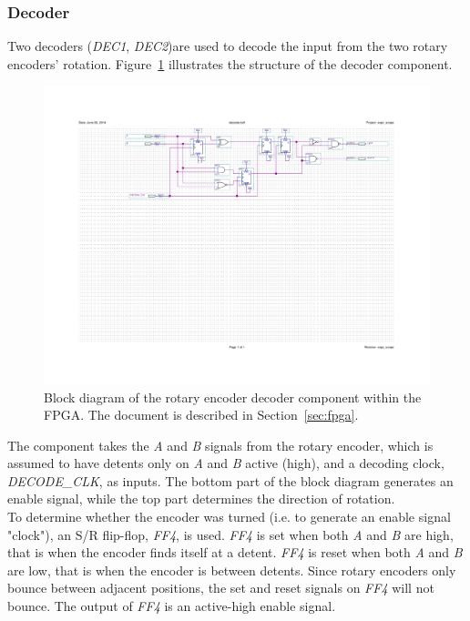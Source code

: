 \documentclass[titlepage]{scrartcl}
\begin{document}
	\clearpage
	
	\subsubsection{Decoder \label{sec:decoder}}
	Two decoders (\textit{DEC1}, \textit{DEC2})are used to decode the input from the two rotary encoders' rotation. Figure~\ref{fig:decoder_bdf} illustrates the structure of the decoder component.\\

	\begin{figure}[h!]
	\vspace{-4cm}
	\centerline{\includegraphics[width=30cm, angle=90, origin=c]{img/decoder.pdf}}	
		\vspace{-2cm}
                	\caption{Block diagram of the rotary encoder decoder component within the FPGA. The document is described in Section~\ref{sec:fpga}.}
               	\label{fig:decoder_bdf}
	\end{figure}

	The component takes the \textit{A} and \textit{B} signals from the rotary encoder, which is assumed to have detents only on \textit{A} and \textit{B} active (high), and a decoding clock, \textit{DECODE\_CLK}, as inputs. The bottom part of the block diagram generates an enable signal, while the top part determines the direction of rotation.\\

	To determine whether the encoder was turned (i.e. to generate an enable signal "clock"), an S/R flip-flop, \textit{FF4}, is used. \textit{FF4} is set when both \textit{A} and \textit{B} are high, that is when the encoder finds itself at a detent. \textit{FF4} is reset when both \textit{A} and \textit{B} are low, that is when the encoder is between detents. Since rotary encoders only bounce between adjacent positions, the set and reset signals on \textit{FF4} will not bounce. The output of \textit{FF4} is an active-high enable signal.\\
\end{document}
